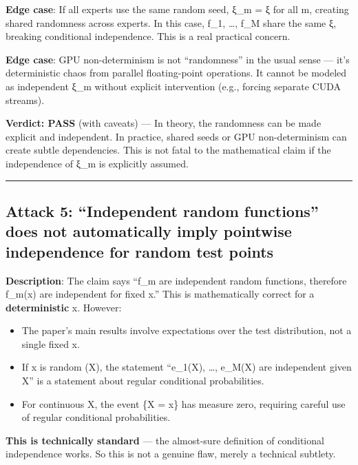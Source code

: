 \documentclass[
  12pt,
]{article}
\providecommand{\tightlist}{%
  \setlength{\itemsep}{0pt}\setlength{\parskip}{0pt}}
\begin{document}
\textbf{Edge case}: If all experts use the same random seed, ξ\_m = ξ
for all m, creating shared randomness across experts. In this case,
f\_1, \ldots, f\_M share the same ξ, breaking conditional independence.
This is a real practical concern.

\textbf{Edge case}: GPU non-determinism is not ``randomness'' in the
usual sense --- it's deterministic chaos from parallel floating-point
operations. It cannot be modeled as independent ξ\_m without explicit
intervention (e.g., forcing separate CUDA streams).

\textbf{Verdict: PASS} (with caveats) --- In theory, the randomness can
be made explicit and independent. In practice, shared seeds or GPU
non-determinism can create subtle dependencies. This is not fatal to the
mathematical claim if the independence of ξ\_m is explicitly assumed.

\begin{center}\rule{0.5\linewidth}{0.5pt}\end{center}

\subsection{Attack 5: ``Independent random functions'' does not
automatically imply pointwise independence for random test
points}\label{attack-5-independent-random-functions-does-not-automatically-imply-pointwise-independence-for-random-test-points}

\textbf{Description}: The claim says ``f\_m are independent random
functions, therefore f\_m(x) are independent for fixed x.'' This is
mathematically correct for a \textbf{deterministic} x. However:

\begin{itemize}
\tightlist
\item
  The paper's main results involve expectations over the test
  distribution, not a single fixed x.
\item
  If x is random (X), the statement ``e\_1(X), \ldots, e\_M(X) are
  independent given X'' is a statement about regular conditional
  probabilities.
\item
  For continuous X, the event \{X = x\} has measure zero, requiring
  careful use of regular conditional probabilities.
\end{itemize}

\textbf{This is technically standard} --- the almost-sure definition of
conditional independence works. So this is not a genuine flaw, merely a
technical subtlety.
\end{document}
